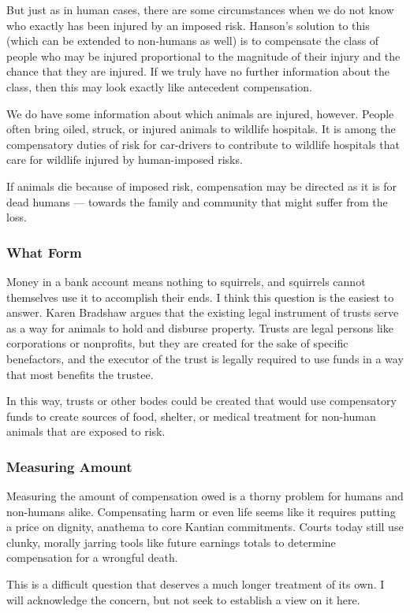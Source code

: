 But just as in human cases, there are some circumstances when we do not know
who exactly has been injured by an imposed risk. Hanson’s solution to this
(which can be extended to non-humans as well) is to compensate the class of
people who may be injured proportional to the magnitude of their injury and the
chance that they are injured. If we truly have no further information about the
class, then this may look exactly like antecedent compensation.

We do have some information about which animals are injured, however. People
often bring oiled, struck, or injured animals to wildlife hospitals. It is
among the compensatory duties of risk for car-drivers to contribute to wildlife
hospitals that care for wildlife injured by human-imposed risks.

If animals die because of imposed risk, compensation may be directed as it is
for dead humans --- towards the family and community that might suffer from the
loss.

\subsubsection{What Form}

Money in a bank account means nothing to squirrels, and squirrels cannot
themselves use it to accomplish their ends. I think this question is the
easiest to answer. Karen Bradshaw argues that the existing legal instrument of
trusts serve as a way for animals to hold and disburse property. Trusts are
legal persons like corporations or nonprofits, but they are created for the
sake of specific benefactors, and the executor of the trust is legally required
to use funds in a way that most benefits the trustee.

In this way, trusts or other bodes could be created that would use compensatory
funds to create sources of food, shelter, or medical treatment for non-human
animals that are exposed to risk.

\subsubsection{Measuring Amount}

Measuring the amount of compensation owed is a thorny problem for humans and
non-humans alike.  Compensating harm or even life seems like it requires
putting a price on dignity, anathema to core Kantian commitments.  Courts today
still use clunky, morally jarring tools like future earnings totals to
determine compensation for a wrongful death.

This is a difficult question that deserves a much longer treatment of its own.
I will acknowledge the concern, but not seek to establish a view on it here.
